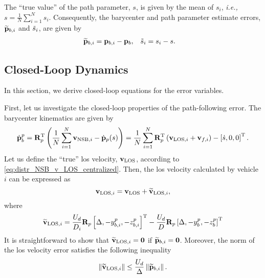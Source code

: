 The ``true value'' of the path parameter, $s$, is given by the mean of $s_i$, \emph{i.e.,} $s = \frac{1}{N} \sum_{i=1}^N s_i$.
Consequently, the barycenter and path parameter estimate errors, $\widetilde{\mathbf{p}}_{b, i}$ and $\Tilde{s}_{i}$, are given by
\begin{align}
    \widetilde{\mathbf{p}}_{b, i} &= \mathbf{p}_{b, i} - \mathbf{p}_b, &
    \Tilde{s}_{i} &= s_i - s. \label{eq:distr_NSB_consensus_errors}
\end{align}

\subsection{Closed-Loop Dynamics}
In this section, we derive closed-loop equations for the error variables.

First, let us investigate the closed-loop properties of the path-following error.
The barycenter kinematics are given by
\begin{equation}
        \dot{\mathbf{p}}_b^p = \mathbf{R}_p^{\mathrm{T}} \left(\frac{1}{N}\sum_{i=1}^N \mathbf{v}_{{\rm NSB}, i} - \dot{\mathbf{p}}_p(s)\right)
        = \frac{1}{N}\sum_{i=1}^N\mathbf{R}_p^{\mathrm{T}} \left(\mathbf{v}_{{\rm LOS}, i} + \mathbf{v}_{f, i}\right) - \left[\dot{s}, 0, 0\right]^{\mathrm{T}}.
    \label{eq:distr_NSB_p_b_CL_1}
\end{equation}
Let us define the ``true'' \gls{los} velocity, $\mathbf{v}_{\rm LOS}$, according to \eqref{eq:distr_NSB_v_LOS_centralized}.
Then, the \gls{los} velocity calculated by vehicle $i$ can be expressed as
\begin{equation}
    \mathbf{v}_{{\rm LOS}, i} = \mathbf{v}_{\rm LOS} + \widetilde{\mathbf{v}}_{{\rm LOS}, i}, \label{eq:distr_NSB_v_LOS_CL}
\end{equation}
where
\begin{equation}
    \widetilde{\mathbf{v}}_{{\rm LOS}, i} = \frac{U_d}{D_i} \mathbf{R}_p \left[\Delta, -y_{b, i}^p, -z_{b, i}^p\right]^{\mathrm{T}} - \frac{U_d}{D} \mathbf{R}_p \left[\Delta, -y_{b}^p, -z_{b}^p\right]^{\mathrm{T}}
\end{equation}
It is straightforward to show that $\widetilde{\mathbf{v}}_{{\rm LOS}, i} = \mathbf{0}$ if $\widetilde{\mathbf{p}}_{b, i} = \mathbf{0}$.
Moreover, the norm of the \gls{los} velocity error satisfies the following inequality
\begin{equation}
    \left\|\widetilde{\mathbf{v}}_{{\rm LOS}, i}\right\| \leq \frac{U_d}{\Delta} \left\|\widetilde{\mathbf{p}}_{b, i}\right\|.
    \label{eq:distr_NSB_v_LOS_tilde}
\end{equation}
